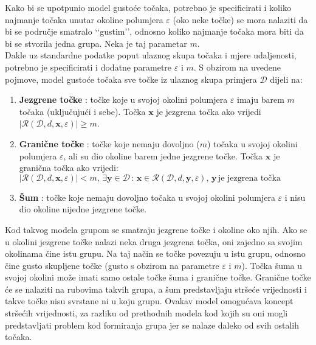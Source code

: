 \documentclass[times, utf8, zavrsni]{fer}
\begin{document}
Kako bi se upotpunio model gustoće točaka, potrebno je specificirati i koliko najmanje točaka unutar okoline polumjera $\varepsilon$ (oko neke točke) se mora nalaziti da bi se područje smatralo ‘‘gustim’’, odnosno koliko najmanje točaka mora biti da bi se stvorila jedna grupa. Neka je taj parametar $m$.\\
Dakle uz standardne podatke poput ulaznog skupa točaka i mjere udaljenosti, potrebno je specificirati i dodatne parametre $\varepsilon$ i $m$. S obzirom na uvedene pojmove, model gustoće točaka sve točke iz ulaznog skupa primjera $\mathcal{D}$ dijeli na:
\begin{enumerate}
    \item \textbf{Jezgrene točke} : točke koje u svojoj okolini polumjera $\varepsilon$ imaju barem $m$ točaka (uključujući i sebe). Točka $\mathbf{x}$ je jezgrena točka ako vrijedi $\left\vert\mathcal{R} \left(\mathcal{D}, d, \mathbf{x}, \varepsilon\right)\right\vert \geq m$.
    
    \item \textbf{Granične točke} : točke koje nemaju dovoljno ($m$) točaka u svojoj okolini polumjera $\varepsilon$, ali su dio okoline barem jedne jezgrene točke. Točka $\mathbf{x}$ je granična točka ako vrijedi:\\
    $\left\vert\mathcal{R} \left(\mathcal{D}, d, \mathbf{x}, \varepsilon\right)\right\vert < m, \, 
    \exists \mathbf{y} \in \mathcal{D} \, : \,
    \mathbf{x} \in \mathcal{R} \left(\mathcal{D}, d, \mathbf{y}, \varepsilon\right), \,
    \mathbf{y} \, \text{je jezgrena točka}$
    
    \item \textbf{Šum} : točke koje nemaju dovoljno točaka u svojoj okolini polumjera $\varepsilon$ i nisu dio okoline nijedne jezgrene točke.
\end{enumerate}
Kod takvog modela grupom se smatraju jezgrene točke i okoline oko njih. Ako se u okolini jezgrene točke nalazi neka druga jezgrena točka, oni zajedno sa svojim okolinama čine istu grupu. Na taj način se točke povezuju u istu grupu, odnosno čine gusto skupljene točke (gusto s obzirom na parametre $\varepsilon$ i $m$). Točka šuma u svojoj okolini može imati samo ostale točke šuma i granične točke. Granične točke će se nalaziti na rubovima takvih grupa, a šum predstavljaju stršeće vrijednosti i takve točke nisu svrstane ni u koju grupu. Ovakav model omogućava koncept stršećih vrijednosti, za razliku od prethodnih modela kod kojih su oni mogli predstavljati problem kod formiranja grupa jer se nalaze daleko od svih ostalih točaka.
\end{document}
